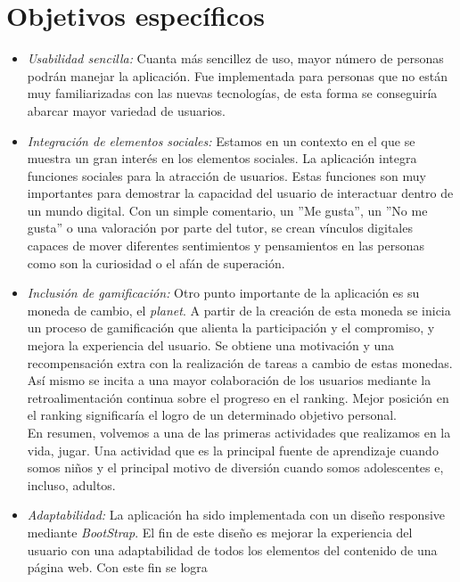 \documentclass[a4paper, 12pt]{book}
\begin{document}
\section{Objetivos espec\'ificos}
\label{sec:objetivos-especificos}
\begin{itemize}
  \item \textit {Usabilidad sencilla:} Cuanta m\'as sencillez de uso, mayor n\'umero de personas podr\'an manejar la aplicaci\'on. 
  Fue implementada para personas que no est\'an muy familiarizadas con las nuevas tecnolog\'ias, de esta forma se conseguir\'ia 
  abarcar mayor variedad de usuarios.
  \item \textit {Integraci\'on de elementos sociales:} Estamos en un contexto en el que se muestra un gran inter\'es en los elementos sociales. La aplicaci\'on
  integra funciones sociales para la atracci\'on de usuarios. Estas funciones son muy importantes para demostrar la capacidad del usuario 
  de interactuar dentro de un mundo digital. Con un simple comentario, un ''Me gusta'', un ''No me gusta'' o una valoraci\'on por parte del 
  tutor, se crean v\'inculos digitales capaces de mover diferentes sentimientos y pensamientos en las personas como son la curiosidad o el 
  af\'an de superaci\'on.
  \item \textit {Inclusi\'on de gamificaci\'on:} Otro punto importante de la aplicaci\'on es su moneda de cambio, el \textit{planet}. A 
  partir de la creaci\'on de esta moneda se inicia un proceso de gamificaci\'on que alienta la participaci\'on y el compromiso, y mejora la 
  experiencia del usuario. 
  Se obtiene una motivaci\'on y una recompensaci\'on extra con la realizaci\'on de tareas a cambio de estas monedas. As\'i mismo se incita a una 
  mayor colaboraci\'on de los usuarios mediante la retroalimentaci\'on continua sobre el progreso en el ranking. Mejor posici\'on en el ranking 
  significar\'ia el logro de un determinado objetivo personal.\\
  En resumen, volvemos a una de las primeras actividades que realizamos en la vida, jugar. Una actividad que es la principal fuente de 
  aprendizaje cuando somos ni\~nos y el principal motivo de diversi\'on cuando somos adolescentes e, incluso, adultos.
  \item \textit {Adaptabilidad:} La aplicaci\'on ha sido implementada con un dise\~no responsive mediante \textit{BootStrap}. El fin de este dise\~no 
  es mejorar la experiencia del usuario con una adaptabilidad de todos los elementos del contenido de una p\'agina web. Con este fin se logra 

\end{itemize}
\end{document}
